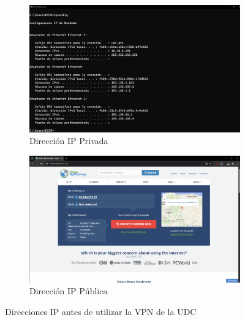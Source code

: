 \begin{figure}[H]
    \centering
    \begin{subfigure}{.5\textwidth}
        \centering
        \includegraphics[width=\linewidth]{IP-Privada-VPN-UDC.png}
        \caption{Dirección IP Privada}
    \end{subfigure}%
    \begin{subfigure}{.5\textwidth}
        \centering
        \includegraphics[width=\linewidth]{IP-Publica-VPN-UDC.png}
        \caption{Dirección IP Pública}
    \end{subfigure}
    \caption{Direcciones IP antes de utilizar la VPN de la UDC}
    \label{fig:IPs-VPN-UDC}
\end{figure}


